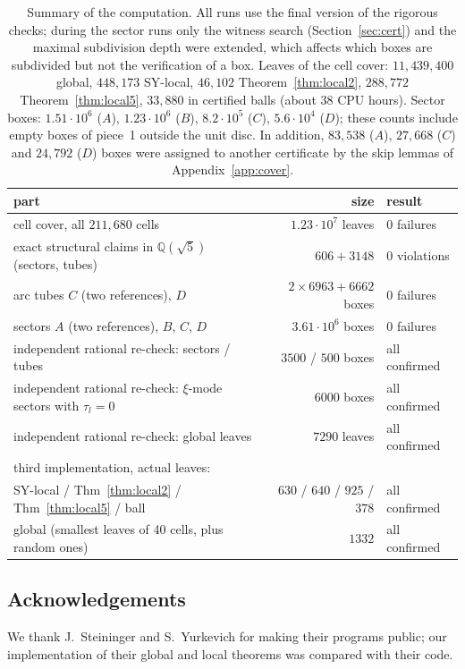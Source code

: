 \documentclass[11pt]{amsart}
\theoremstyle{definition}
\newcommand{\Q}{\mathbb{Q}}
\newcommand{\sq}{\sqrt5}
\begin{document}
\begin{table}[h]
\centering\small
\begin{tabular}{@{}lrl@{}}
\toprule
part & size & result\\ \midrule
cell cover, all $211{,}680$ cells & $1.23\cdot10^7$ leaves & 0 failures\\
exact structural claims in $\Q(\sq)$ (sectors, tubes) & $606+3148$ & 0 violations\\
arc tubes $C$ (two references), $D$ & $2\times6963+6662$ boxes & 0 failures\\
sectors $A$ (two references), $B$, $C$, $D$ & $3.61\cdot10^6$ boxes & 0 failures\\
independent rational re-check: sectors / tubes & $3500$ / $500$ boxes & all confirmed\\
independent rational re-check: $\xi$-mode sectors with $\tau_l=0$ & $6000$ boxes & all confirmed\\
independent rational re-check: global leaves & $7290$ leaves & all confirmed\\
third implementation, actual leaves: & & \\
\quad SY-local / Thm~\ref{thm:local2} / Thm~\ref{thm:local5} / ball & $630$ / $640$ / $925$ / $378$ & all confirmed\\
\quad global (smallest leaves of 40 cells, plus random ones) & $1332$ & all confirmed\\ \bottomrule
\end{tabular}
\caption{Summary of the computation. All runs use the final version of the rigorous checks; during the sector runs
only the witness search (Section~\ref{sec:cert}) and the maximal subdivision depth were extended, which affects which
boxes are subdivided but not the verification of a box. Leaves of the cell cover:
$11{,}439{,}400$ global, $448{,}173$ SY-local, $46{,}102$ Theorem~\ref{thm:local2}, $288{,}772$ Theorem~\ref{thm:local5},
$33{,}880$ in certified balls (about $38$ CPU hours). Sector boxes: $1.51\cdot10^6$ ($A$), $1.23\cdot10^6$ ($B$),
$8.2\cdot10^5$ ($C$), $5.6\cdot10^4$ ($D$); these counts include empty boxes of piece~1 outside the unit disc. In
addition, $83{,}538$ ($A$), $27{,}668$ ($C$) and $24{,}792$ ($D$) boxes were assigned to another certificate by the skip
lemmas of Appendix~\ref{app:cover}.}\label{tab:status}
\end{table}


\subsection*{Acknowledgements}
We thank J.~Steininger and S.~Yurkevich for making their programs public; our implementation of their global and local
theorems was compared with their code.
\end{document}
